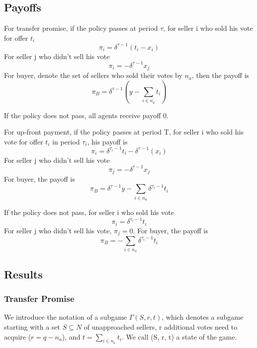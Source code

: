 \documentclass[ProjectGAZ]{subfiles}
\begin{document}
\subsection{Payoffs}\label{subsec:CnZ-Payoffs}

For transfer promise, if the policy passes at period $\tau$, for seller i who sold his vote for offer $t_i$
\begin{equation}
	\pi_i = \delta^{\tau-1}(t_i - x_i)
\end{equation}
For seller j who didn't sell his vote
\begin{equation}
	\pi_i = - \delta^{\tau-1}x_j
\end{equation}
For buyer, denote the set of sellers who sold their votes by $n_a$, then the payoff is
\begin{equation}
	\pi_B = \delta^{\tau-1}(y - \sum_{i \in n_a}t_i)
\end{equation}

If the policy does not pass, all agents receive payoff 0.

For up-front payment, if the policy passes at period T, for seller i who sold his vote for offer $t_i$ in period $\tau_i$, his payoff is
\begin{equation}
	\pi_i = \delta^{\tau_i-1}t_i - \delta^{\tau-1}(x_i)
\end{equation}
For seller j who didn't sell his vote
\begin{equation}
	\pi_j = - \delta^{\tau-1}x_j
\end{equation}
For buyer, the payoff is
\begin{equation}
	\pi_B = \delta^{\tau-1}y - \sum_{i \in n_a}\delta^{\tau_i - 1}t_i
\end{equation}

If the policy does not pass, for seller i who sold his vote
\begin{equation}
	\pi_i = \delta^{\tau_i-1}t_i 
\end{equation}
For seller j who didn't sell his vote, $\pi_j = 0$.
For buyer, the payoff is
\begin{equation}
	\pi_B = - \sum_{i \in n_a}\delta^{\tau_i - 1}t_i
\end{equation}

\subsection{Results}\label{subsec:CnZ-Results}
\subsubsection{Transfer Promise}
We introduce the notation of a subgame $\Gamma(S,r,t)$, which denotes a subgame starting with a set $S\subseteq N$ of unapproached sellers, r additional votes need to acquire ($r = q - n_a$), and $t = \sum_{i \in n_a} t_i$. We call (S, r, t) a state of the game.
\end{document}
